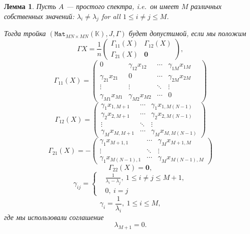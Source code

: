 \documentclass[14pt,a4paper]{extarticle}
\numberwithin{equation}{section}
\newtheorem{lem}{Лемма}
\theoremstyle{definition}
\begin{document}
\begin{lem}
Пусть \( A \) --- простого спектра,
    i.e.\ он имеет \( M \) различных собственных значений:
    \( \lambda_i\neq\lambda_j \) for all \( 1\leq i{\neq}j \leq M \).

    Тогда тройка \( (\mathtt{Mat}_{{MN}{\times}{MN}}(\mathbb{K}), J, \Gamma) \)
    будет допустимой, если мы положим
    \[
        \Gamma X = 
        \frac1n \left(\begin{array}{c|c}
                        \Gamma_{11}(X) & \Gamma_{12}(X) \\ \hline
                        \Gamma_{21}(X) & \mathbf{0}
                      \end{array}\right),
                                      \]
    \[
        \Gamma_{11}(X) =
              \begin{pmatrix}
                0               & \gamma_{12}x_{12} & \cdots & \gamma_{1M}x_{1M} \\
                \gamma_{21}x_{21}  & 0              & \cdots & \gamma_{2M}x_{2M} \\
                \vdots          & \vdots         & \ddots & \vdots & \ \\
                \gamma_{M1}x_{M1}  & \gamma_{M2}x_{M2} & \cdots & 0
              \end{pmatrix}
    \]
    \[
        \Gamma_{12}(X) =
            \begin{pmatrix}
                \gamma_{1}x_{1,M+1} & \cdots & \gamma_{1}x_{1,M(N-1)} \\
                \gamma_{2}x_{2,M+1} & \cdots & \gamma_{2}x_{2,M(N-1)} \\
                \vdots                & \ddots &  \vdots                \\
                \gamma_{M}x_{M,M+1} & \cdots & \gamma_{M}x_{M,M(N-1)}
            \end{pmatrix}
    \]
    \[
        \Gamma_{21}(X) =
            - \begin{pmatrix}
                \gamma_{1}x_{M{+}1,1} &
                \cdots &
                \gamma_{M}x_{M{+}1,M}
                \\
                \vdots & \ddots & \vdots
                \\
                \gamma_{1}x_{M(N-1),1} &
                \cdots &
                \gamma_{M}x_{M(N-1),M}
            \end{pmatrix}
    \]
    \[
        \Gamma_{22}(X) = \mathbf{0},
    \]
    \[
        \gamma_{ij} = \left\{
            \begin{aligned}
                & \frac{1}{\lambda_i - \lambda_j},\ 1\leq i{\neq}j \leq M{+}1,\\
                & 0,\ i=j
            \end{aligned}
            \right.
    \]
    \[
        \gamma_{i} =
                \frac{1}{ \lambda_i},\ 1\leq i \leq M,
    \]
    где мы использовали соглашение
    \[
        \lambda_{M{+}1} = 0.
    \]


\end{lem}
\end{document}
